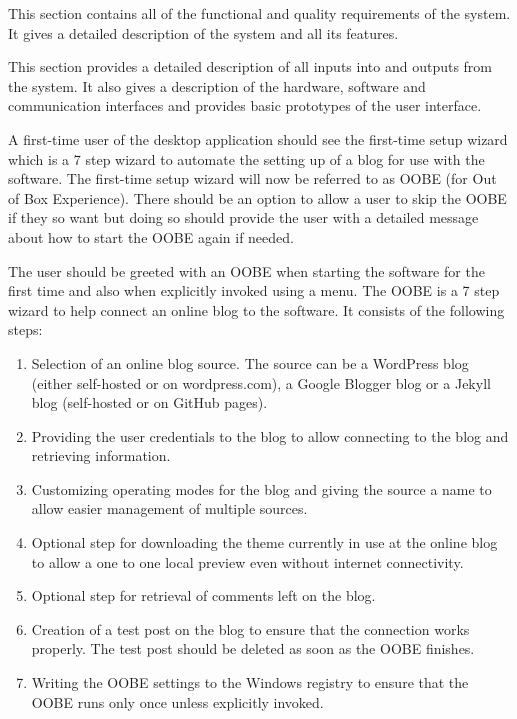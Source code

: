 
This section contains all of the functional and quality requirements of the system. It gives a detailed description of
the system and all its features.


This section provides a detailed description of all inputs into and outputs from the system. It also gives a description
of the hardware, software and communication interfaces and provides basic prototypes of the user interface.


A first-time user of the desktop application should see the first-time setup wizard which is a 7 step wizard to automate
the setting up of a blog for use with the software. The first-time setup wizard will now be referred to as OOBE (for Out
of Box Experience). There should be an option to allow a user to skip the OOBE if they so want but doing so should
provide the user with a detailed message about how to start the OOBE again if needed.


The user should be greeted with an OOBE when starting the software for the first time and also when explicitly invoked
using a menu. The OOBE is a 7 step wizard to help connect an online blog to the software. It consists of the following
steps:

\begin{enumerate}
    \item {Selection of an online blog source. The source can be a WordPress blog (either self-hosted or on
           wordpress.com), a Google Blogger blog or a Jekyll blog (self-hosted or on GitHub pages).}
    \item {Providing the user credentials to the blog to allow connecting to the blog and retrieving information.}
    \item {Customizing operating modes for the blog and giving the source a name to allow easier management of multiple
           sources.}
    \item {Optional step for downloading the theme currently in use at the online blog to allow a one to one local
           preview even without internet connectivity.}
    \item {Optional step for retrieval of comments left on the blog.}
    \item {Creation of a test post on the blog to ensure that the connection works properly. The test post should be
           deleted as soon as the OOBE finishes.}
    \item {Writing the OOBE settings to the Windows registry to ensure that the OOBE runs only once unless explicitly
           invoked.}
\end{enumerate}

